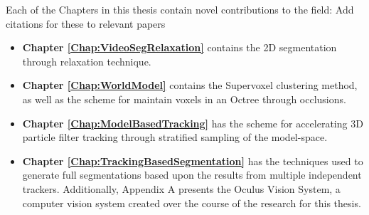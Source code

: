 Each of the Chapters in this thesis contain novel contributions to the field: 
\todo[inline] Add citations for these to relevant papers
\begin{itemize}
\item {\bf Chapter \ref{Chap:VideoSegRelaxation} } contains the 2D segmentation through relaxation technique. 

\item {\bf Chapter \ref{Chap:WorldModel} } contains the Supervoxel clustering method, as well as the scheme for maintain voxels in an Octree through occlusions. 

\item {\bf Chapter \ref{Chap:ModelBasedTracking} } has the scheme for accelerating 3D particle filter tracking through stratified sampling of the model-space. 

\item {\bf Chapter \ref{Chap:TrackingBasedSegmentation} } has the techniques used to generate full segmentations based upon the results from multiple independent trackers. Additionally, Appendix A presents the Oculus Vision System, a computer vision system created over the course of the research for this thesis.
\end{itemize}